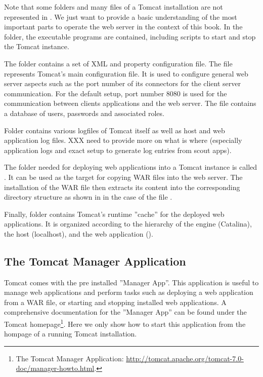 \documentclass[a4paper,10pt,twoside]{book}
\begin{document}
Note that some folders and many files of a Tomcat installation are not represented in .
We just want to provide a basic understanding of the most important parts to operate the web server in the context of this book.
In the  folder, the executable programs are contained, including scripts to start and stop the Tomcat instance.

The  folder contains a set of XML and property configuration file.
The file  represents Tomcat's main configuration file.
It is used to configure general web server aspects such as the port number of its connectors for the client server communication.
For the default setup, port number 8080 is used for the communication between clients applications and the web server.
The file  contains a database of users, passwords and associated roles.

Folder  contains various logfiles of Tomcat itself as well as host and web application log files.
XXX need to provide more on what is where (especially application logs and exact setup to generate log entries from scout apps).

The folder needed for deploying web applications into a Tomcat instance is called .
It can be used as the target for copying WAR files into the web server.
The installation of the WAR file then extracts its content into the corresponding directory structure as shown in  in the case of the file .

Finally, folder  contains Tomcat's runtime ''cache'' for the deployed web applications.
It is organized according to the hierarchy of the engine (Catalina), the host (localhost), and the web application ().

\subsection{The Tomcat Manager Application}

Tomcat comes with the pre installed ''Manager App''.
This application is useful to manage web applications and perform tasks such as deploying a web application from a WAR file, or starting and stopping installed web applications.
A comprehensive documentation for the ''Manager App'' can be found under the Tomcat homepage\footnote{
The Tomcat Manager Application: \url{http://tomcat.apache.org/tomcat-7.0-doc/manager-howto.html}.
}.
Here we only show how to start this application from the hompage of a running Tomcat installation.
\end{document}
